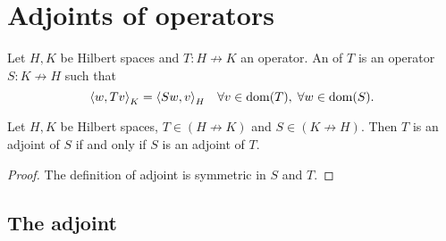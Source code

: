 \section{Adjoints of operators}
\begin{definition}
Let $H,K$ be Hilbert spaces and $T: H\not\to K$ an operator. An  of $T$ is an operator $S: K\not\to H$ such that
\[ \inner{w,Tv}_K = \inner{S w,v}_H \quad \forall v\in \dom(T),\; \forall w\in \dom(S). \]
\end{definition}

\begin{lemma} \label{adjointRequirementSymmetric}
Let $H,K$ be Hilbert spaces, $T\in (H\not\to K)$ and $S\in(K\not\to H)$. Then $T$ is an adjoint of $S$ \textup{if and only if} $S$ is an adjoint of $T$.
\end{lemma}
\begin{proof}
The definition of adjoint is symmetric in $S$ and $T$.
\end{proof}

\subsection{The adjoint}
